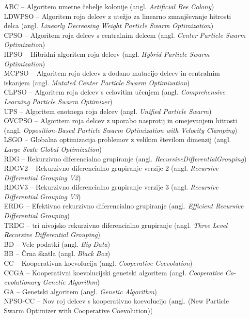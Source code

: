 ABC -- Algoritem umetne čebelje kolonije (angl. \textit{Artificial Bee Colony}) \\
LDWPSO -- Algoritem roja delcev z utežjo za linearno zmanjševanje hitrosti delca (angl. \textit{Linearly Decreasing Weight Particle Swarm Optimization}) \\
CPSO -- Algoritem roja delcev s centralnim delcem (angl. \textit{Center Particle Swarm Optimization}) \\
HPSO -- Hibridni algoritem roja delcev (angl. \textit{Hybrid Particle Swarm Optimization}) \\
MCPSO -- Algoritem roja delcev z dodano mutacijo delcev in centralnim iskanjem (angl. \textit{Mutated Center Particle Swarm Optimization}) \\
CLPSO -- Algoritem roja delcev s celovitim učenjem (angl. \textit{Comprehensive Learning Particle Swarm Optimizer}) \\
UPS -- Algoritem enotnega roja delcev (angl. \textit{Unified Particle Swarm}) \\
OVCPSO -- Algoritem roja delcev z uporabo nasprotij in omejevanjem hitrosti (angl. \textit{Opposition-Based Particle Swarm Optimization with Velocity Clamping}) \\
LSGO -- Globalna optimizacija problemov z velikim številom dimenzij (angl. \textit{Large Scale Global Optimization}) \\
RDG -- Rekurzivno diferencialno grupiranje (angl. \textit{RecursiveDifferentialGrouping}) \\
RDGV2 -- Rekurzivno diferencialno grupiranje verzije 2 (angl. \textit{Recursive Differential Grouping V2}) \\
RDGV3 -- Rekurzivno diferencialno grupiranje verzije 3 (angl. \textit{Recursive Differential Grouping V3}) \\
ERDG -- Efektivno rekurzivno diferencialno grupiranje (angl. \textit{Efficient Recursive Differential Grouping}) \\
TRDG -- tri nivojsko rekurzivno diferencialno grupiranje (angl. \textit{Three Level Recursive Differential Grouping}) \\
BD -- Vele podatki (angl. \textit{Big Data}) \\
BB -- Črna škatla (angl. \textit{Black Box}) \\
CC -- Kooperativna koevolucija (angl. \textit{Cooperative Coevolution}) \\
CCGA -- Kooperativni koevolucijski genetski algoritem (angl. \textit{Cooperative Co-evolutionary Genetic Algorithm}) \\
GA -- Genetski algoritem (angl. \textit{Genetic Algorithm}) \\
NPSO-CC -- Nov roj delcev s kooperativno koevolucijo (angl. (New Particle Swarm Optimizer with Cooperative Coevolution))\\